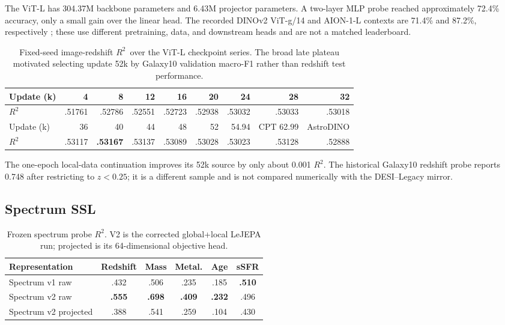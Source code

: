 \documentclass{article}
\newcommand{\rscore}{$R^2$}
\begin{document}
The ViT-L has 304.37M backbone parameters and 6.43M projector parameters.
A two-layer MLP probe reached approximately 72.4\% accuracy, only a small gain
over the linear head.
The recorded DINOv2 ViT-g/14 and AION-1-L contexts are 71.4\% and 87.2\%,
respectively \citep{oquab2023dinov2,parker2025aion}; these use different
pretraining, data, and downstream heads and are not a matched leaderboard.

\begin{table}[h]
\centering
\caption{Fixed-seed image-redshift \rscore\ over the ViT-L checkpoint series.
The broad late plateau motivated selecting update 52k by Galaxy10 validation
macro-F1 rather than redshift test performance.}
\label{tab:image_redshift_series}
\scriptsize
\setlength{\tabcolsep}{3.0pt}
\begin{tabular}{lrrrrrrrr}
\toprule
Update (k) & 4 & 8 & 12 & 16 & 20 & 24 & 28 & 32\\
\midrule
\rscore & .51761 & .52786 & .52551 & .52723 & .52938 & .53032 & .53033 & .53018\\
\midrule
Update (k) & 36 & 40 & 44 & 48 & 52 & 54.94 & CPT 62.99 & AstroDINO\\
\midrule
\rscore & .53117 & \textbf{.53167} & .53137 & .53089 & .53028 & .53023 & .53128 & .52888\\
\bottomrule
\end{tabular}
\end{table}

The one-epoch local-data continuation improves its 52k source by only about
0.001 \rscore.
The historical Galaxy10 redshift probe reports 0.748 after restricting to
$z<0.25$; it is a different sample and is not compared numerically with the
DESI--Legacy mirror.

\subsection{Spectrum SSL}

\begin{table}[h]
\centering
\caption{Frozen spectrum probe \rscore. V2 is the corrected global+local
LeJEPA run; projected is its 64-dimensional objective head.}
\label{tab:spectrum_ssl}
\small
\setlength{\tabcolsep}{5pt}
\begin{tabular}{lccccc}
\toprule
Representation & Redshift & Mass & Metal. & Age & sSFR\\
\midrule
Spectrum v1 raw & .432 & .506 & .235 & .185 & \textbf{.510}\\
Spectrum v2 raw & \textbf{.555} & \textbf{.698} & \textbf{.409} & \textbf{.232} & .496\\
Spectrum v2 projected & .388 & .541 & .259 & .104 & .430\\
\bottomrule
\end{tabular}
\end{table}
\end{document}
